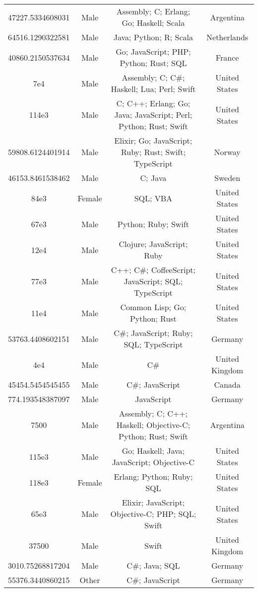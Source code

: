 \begin{center}
\begin{tabular}{ |c|c|c|c| }
47227.5334608031  &  Male  &  Assembly; C; Erlang; Go; Haskell; Scala  &  Argentina  \\ 
64516.1290322581  &  Male  &  Java; Python; R; Scala  &  Netherlands  \\ 
40860.2150537634  &  Male  &  Go; JavaScript; PHP; Python; Rust; SQL  &  France  \\ 
7e4  &  Male  &  Assembly; C; C\#; Haskell; Lua; Perl; Swift  &  United States  \\ 
114e3  &  Male  &  C; C++; Erlang; Go; Java; JavaScript; Perl; Python; Rust; Swift  &  United States  \\ 
59808.6124401914  &  Male  &  Elixir; Go; JavaScript; Ruby; Rust; Swift; TypeScript  &  Norway  \\ 
46153.8461538462  &  Male  &  C; Java  &  Sweden  \\ 
84e3  &  Female  &  SQL; VBA  &  United States  \\ 
67e3  &  Male  &  Python; Ruby; Swift  &  United States  \\ 
12e4  &  Male  &  Clojure; JavaScript; Ruby  &  United States  \\ 
77e3  &  Male  &  C++; C\#; CoffeeScript; JavaScript; SQL; TypeScript  &  United States  \\ 
11e4  &  Male  &  Common Lisp; Go; Python; Rust  &  United States  \\ 
53763.4408602151  &  Male  &  C\#; JavaScript; Ruby; SQL; TypeScript  &  Germany  \\ 
4e4  &  Male  &  C\#  &  United Kingdom  \\ 
45454.5454545455  &  Male  &  C\#; JavaScript  &  Canada  \\ 
774.193548387097  &  Male  &  JavaScript  &  Germany  \\ 
7500  &  Male  &  Assembly; C; C++; Haskell; Objective-C; Python; Rust; Swift  &  Argentina  \\ 
115e3  &  Male  &  Go; Haskell; Java; JavaScript; Objective-C  &  United States  \\ 
118e3  &  Female  &  Erlang; Python; Ruby; SQL  &  United States  \\ 
65e3  &  Male  &  Elixir; JavaScript; Objective-C; PHP; SQL; Swift  &  United States  \\ 
37500  &  Male  &  Swift  &  United Kingdom  \\ 
3010.75268817204  &  Male  &  C\#; Java; SQL  &  Germany  \\ 
55376.3440860215  &  Other  &  C\#; JavaScript  &  Germany  \\ 

\end{tabular}
\end{center}
